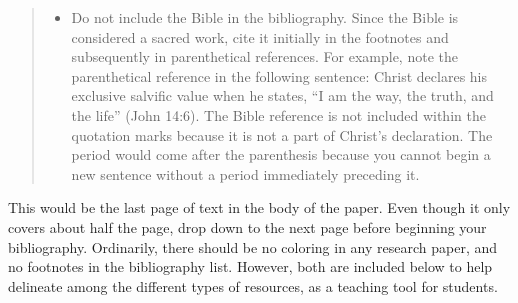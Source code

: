 \documentclass[raggedright]{turabian-researchpaper}
\begin{document}
\begin{quotation}
\begin{itemize}
\item Do not include the Bible in the bibliography. Since the Bible is
  considered a sacred work, cite it initially in the footnotes and subsequently
  in parenthetical references. For example, note the parenthetical reference in
  the following sentence: Christ declares his exclusive salvific value when he
  states, ``I am the way, the truth, and the life'' (John 14:6). The Bible
  reference is not included within the quotation marks because it is not a part
  of Christ's declaration. The period would come after the parenthesis because
  you cannot begin a new sentence without a period immediately preceding it.
\end{itemize}
\end{quotation}

This would be the last page of text in the body of the paper. Even though it
only covers about half the page, drop down to the next page before beginning
your bibliography. Ordinarily, there should be no coloring in any research
paper, and no footnotes in the bibliography list. However, both are included
below to help delineate among the different types of resources, as a teaching
tool for students.

\clearpage
\printbibliography
\end{document}
